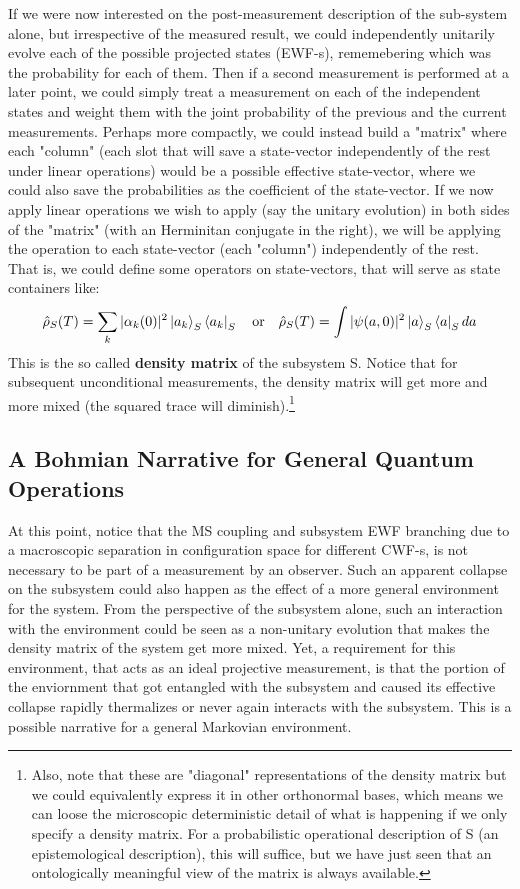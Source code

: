 \documentclass[11pt, a4paper]{article} %
\begin{document}
If we were now interested on the post-measurement description of the sub-system alone, but irrespective of the measured result, we could independently unitarily evolve each of the possible projected states (EWF-s), rememebering which was the probability for each of them. Then if a second measurement is performed at a later point, we could simply treat a measurement on each of the independent states and weight them with the joint probability of the previous and the current measurements. Perhaps more compactly, we could instead build a "matrix" where each "column" (each slot that will save a state-vector independently of the rest under linear operations) would be a possible effective state-vector, where we could also save the probabilities as the coefficient of the state-vector. If we now apply linear operations we wish to apply (say the unitary evolution) in both sides of the "matrix" (with an Herminitan conjugate in the right), we will be applying the operation to each state-vector (each "column") independently of the rest. That is, we could define some operators on state-vectors, that will serve as state containers like:
\begin{equation}\label{dens}
\hat{\rho}_S(T) =\sum_k |\alpha_k(0)|^2\ket{a_k}_S\bra{a_k}_S \quad \text{or} \quad \hat{\rho}_S(T)=\int |\psi(a,0)|^2\ket{a}_S\bra{a}_S da
\end{equation}
This is the so called {\bf density matrix} of the subsystem S. Notice that for subsequent unconditional measurements, the density matrix will get more and more mixed (the squared trace will diminish).\footnote{Also, note that these are "diagonal" representations of the density matrix but we could equivalently express it in other orthonormal bases, which means we can loose the microscopic deterministic detail of what is happening if we only specify a density matrix. For a probabilistic operational description of S (an epistemological description), this will suffice, but we have just seen that an ontologically meaningful view of the matrix is always available.}

\subsection*{A Bohmian Narrative for General Quantum Operations}
At this point, notice that the MS coupling and subsystem EWF branching due to a macroscopic separation in configuration space for different CWF-s, is not necessary to be part of a measurement by an observer. Such an apparent collapse on the subsystem could also happen as the effect of a more general environment for the system. From the perspective of the subsystem alone, such an interaction with the environment could be seen as a non-unitary evolution that makes the density matrix of the system get more mixed. Yet, a requirement for this environment, that acts as an ideal projective measurement, is that the portion of the enviornment that got entangled with the subsystem and caused its effective collapse rapidly thermalizes or never again interacts with the subsystem. This is a possible narrative for a general Markovian environment.
\end{document}
